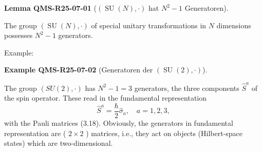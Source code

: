 \documentclass[10pt, letterpaper]{article}
\newcommand{\CustomHeading}[3]{%
  \par\medskip\noindent%
  \textbf{#1 #2} \textnormal{(#3)}.\enskip%
}
\newenvironment{LEM}[2]{\begin{unitbox}\CustomHeading{Lemma}{#1}{#2}}{\end{unitbox}}
\newenvironment{EXA}[2]{\begin{unitbox}\CustomHeading{Example}{#1}{#2}}{\end{unitbox}}
\begin{document}
\begin{LEM}{QMS-R25-07-01}{$(\operatorname{SU}(N), \cdot)$ hat $N^2-1$ Generatoren}
The group $(\operatorname{SU}(N), \cdot)$ of special unitary transformations in $N$ dimensions possesses $N^{2}-1$ generators.
\end{LEM}


Example: 


\begin{EXA}{QMS-R25-07-02}{Generatoren der $(\operatorname{SU}(2), \cdot)$}
The group $(S U(2), \cdot)$ has $N^{2}-1=3$ generators, the three components $\hat{S}^{a}$ of the spin operator. These read in the fundamental representation
$$
\hat{S}^{a}=\frac{\hbar}{2} \hat{\sigma}_{a}, \quad a=1,2,3,
$$
with the Pauli matrices (3.18). Obviously, the generators in fundamental representation are ( $2 \times 2$ ) matrices, i.e., they act on objects (Hilbert-space states) which are two-dimensional.
\end{EXA}
\end{document}
